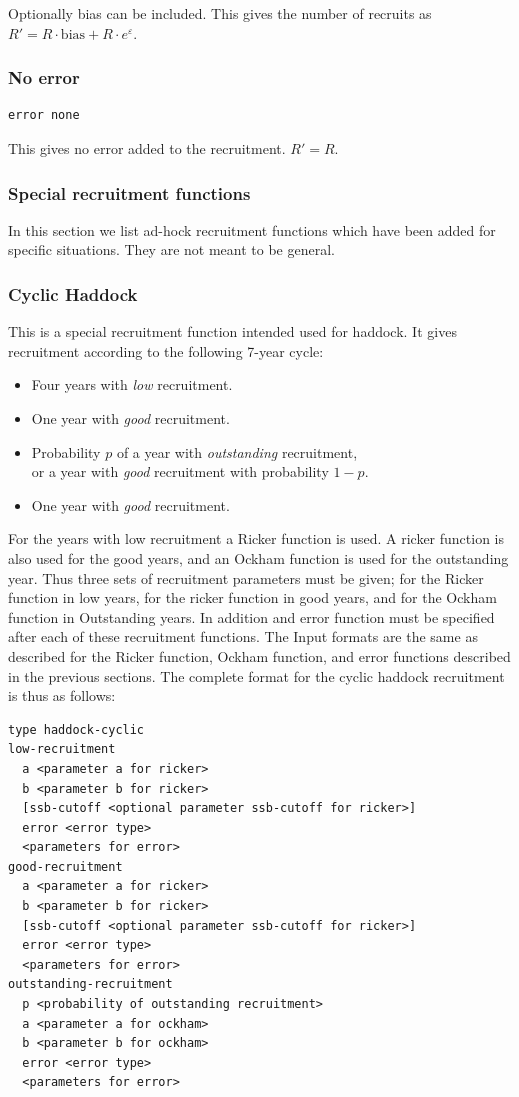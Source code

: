 \documentclass[12pt,twoside,a4paper]{article}
\begin{document}
Optionally bias can be included. This gives the number of recruits as
$R'=R\cdot\mathrm{bias}+R{\cdot}e^{\varepsilon}$.

\subsubsection*{No error}
\begin{verbatim}
error none
\end{verbatim}
This gives no error added to the recruitment. $R'=R$.

\subsubsection{Special recruitment functions}

In this section we list ad-hock recruitment functions which have been added for
specific situations. They are not meant to be general.

\subsubsection*{Cyclic Haddock}
This is a special recruitment function intended used for haddock. It
gives recruitment according to the following 7-year cycle: 
\begin{itemize}
\item Four years with \emph{low} recruitment.
\item One year with \emph{good} recruitment.
\item Probability $p$ of a year with \emph{outstanding} recruitment, \\
      or a year with \emph{good} recruitment with probability $1-p$.
\item One year with \emph{good} recruitment.
\end{itemize}

For the years with low recruitment a Ricker function is used. A ricker
function is also used for the good years, and an Ockham function is used
for the outstanding year. Thus three sets of recruitment parameters
must be given; for the Ricker function in low years, for the ricker
function in good years, and for the Ockham function in Outstanding
years. In addition and error function must be specified after each of
these recruitment functions. The Input formats are the same as
described for the Ricker function, Ockham function, and error functions
described in the previous sections. The complete format for the cyclic
haddock recruitment is thus as follows:
\begin{verbatim}
type haddock-cyclic
low-recruitment
  a <parameter a for ricker>
  b <parameter b for ricker>
  [ssb-cutoff <optional parameter ssb-cutoff for ricker>]
  error <error type>
  <parameters for error>
good-recruitment
  a <parameter a for ricker>
  b <parameter b for ricker>
  [ssb-cutoff <optional parameter ssb-cutoff for ricker>]
  error <error type>
  <parameters for error>
outstanding-recruitment
  p <probability of outstanding recruitment>
  a <parameter a for ockham>
  b <parameter b for ockham>
  error <error type>
  <parameters for error>
\end{verbatim}
\end{document}

